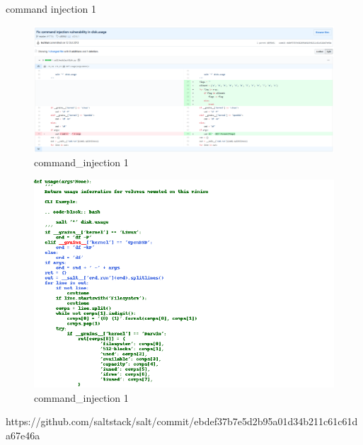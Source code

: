 \documentclass[
a4paper,
pagesize,
pdftex,
12pt,
twoside, %
BCOR=5mm, %
ngerman,
fleqn,
final,
]{scrartcl}
\begin{document}



command injection 1

\begin{figure}[h]
	\centering
	\includegraphics[width=\linewidth]{Images/command_injection1}
	\caption{command\_injection 1}
	\label{fig:command_injection1}
\end{figure}
\begin{figure}[h]
	\centering
	\includegraphics[width=\linewidth]{Images/command_injection1r}
	\caption{command\_injection 1}
	\label{fig:command_injection1r}
\end{figure}
https://github.com/saltstack/salt/commit/ebdef37b7e5d2b95a01d34b211c61c61da67e46a
\end{document}

